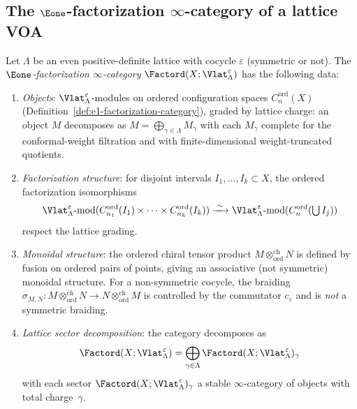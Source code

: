 \subsection{The $\Eone$-factorization $\infty$-category of a lattice VOA}

\begin{construction}
\label{constr:lattice:e1-fact-cat}
Let $\Lambda$ be an even positive-definite lattice with cocycle
$\varepsilon$ (symmetric or not). The \emph{$\Eone$-factorization
$\infty$-category} $\Factord(X; \Vlat_\Lambda^\varepsilon)$
has the following data:
\begin{enumerate}[label=(\roman*)]
\item \emph{Objects}: $\Vlat_\Lambda^\varepsilon$-modules on ordered
 configuration spaces $C_n^{\mathrm{ord}}(X)$
 (Definition~\ref{def:e1-factorization-category}), graded by
 lattice charge: an object $M$ decomposes as
 $M = \bigoplus_{\gamma \in \Lambda} M_\gamma$ with each
 $M_\gamma$ complete for the conformal-weight filtration and with
 finite-dimensional weight-truncated quotients.
\item \emph{Factorization structure}: for disjoint intervals
 $I_1, \ldots, I_k \subset X$, the ordered factorization isomorphisms
 \[
 \Vlat_\Lambda^\varepsilon\text{-mod}(
 C_{n_1}^{\mathrm{ord}}(I_1) \times \cdots
 \times C_{n_k}^{\mathrm{ord}}(I_k))
 \xrightarrow{\;\sim\;}
 \Vlat_\Lambda^\varepsilon\text{-mod}(
 C_n^{\mathrm{ord}}(\textstyle\bigcup I_j))
 \]
 respect the lattice grading.
\item \emph{Monoidal structure}: the ordered chiral tensor product
 $M \otimes^{\mathrm{ch}}_{\mathrm{ord}} N$ is defined by fusion on
 ordered pairs of points, giving an associative (not symmetric)
 monoidal structure. For a non-symmetric cocycle, the braiding
 $\sigma_{M,N} \colon M \otimes^{\mathrm{ch}}_{\mathrm{ord}} N
 \to N \otimes^{\mathrm{ch}}_{\mathrm{ord}} M$
 is controlled by the commutator $c_\varepsilon$ and is \emph{not}
 a symmetric braiding.
\item \emph{Lattice sector decomposition}: the category decomposes as
 \[
 \Factord(X; \Vlat_\Lambda^\varepsilon)
 = \bigoplus_{\gamma \in \Lambda}
 \Factord(X; \Vlat_\Lambda^\varepsilon)_\gamma
 \]
 with each sector $\Factord(X; \Vlat_\Lambda^\varepsilon)_\gamma$
 a stable $\infty$-category of objects with total charge~$\gamma$.
\end{enumerate}
\end{construction}

